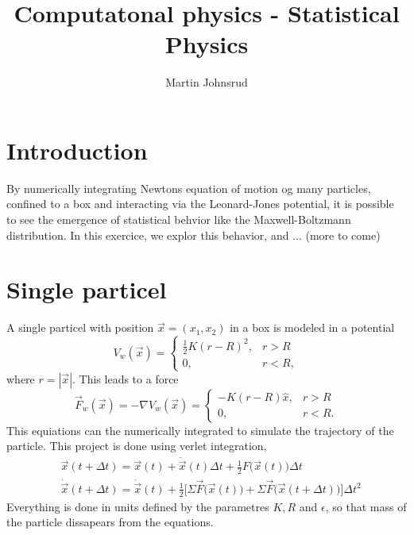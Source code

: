 \documentclass{article}
\title{Computatonal physics - Statistical Physics}
\author{Martin Johnsrud}
\begin{document}
    \maketitle
    
    \section*{Introduction}
    By numerically integrating Newtons equation of motion og many particles, confined to a box and interacting via the Leonard-Jones potential, it is possible to see the emergence of statistical behvior like the Maxwell-Boltzmann distribution. In this exercice, we explor this behavior, and ... (more to come)

    \section*{Single particel}
        A single particel with position $\vec x = (x_1, x_2)$ in a box is modeled in a potential 
        \begin{equation*}
            V_w(\vec x) = 
            \begin{cases}
                \frac{1}{2}K(r - R)^2, & r > R \\
                0, & r < R,
            \end{cases}
        \end{equation*}
        where $r = |\vec x|$. This leads to a force 
        \begin{equation*}
            \vec F_w(\vec x) = -\nabla V_w(\vec x) = 
            \begin{cases}
                -K(r - R)\hat x, & r>R \\
                0, & r<R.
            \end{cases}
        \end{equation*}
        This equiations can the numerically integrated to simulate the trajectory of the particle. This project is done using verlet integration, 
        \begin{align*} 
            & \vec x(t + \Delta t) = \vec x(t) + \dot{\vec x}(t) \Delta t + \frac{1}{2} F\big(\vec x(t)\big) \Delta t \\
            & \dot{\vec x}(t + \Delta t) = \dot{\vec x}(t) + \frac{1}{2} \Big[\Sigma \vec F\big(\vec x(t)\big) + \Sigma \vec F\big(\vec x(t + \Delta t)\big)\Big] \Delta t^2
        \end{align*}
        Everything is done in units defined by the parametres $K, R$ and $\epsilon$, so that mass of the particle dissapears from the equations.
\end{document}
